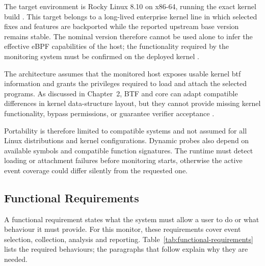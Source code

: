 The target environment is Rocky Linux 8.10 on x86-64, running the exact kernel
build . This target belongs to a
long-lived enterprise kernel line in which selected fixes and features are
backported while the reported upstream base version remains stable. The
nominal version therefore cannot be used alone to infer the effective eBPF
capabilities of the host; the functionality required by the monitoring system
must be confirmed on the deployed kernel
\cite{redhat2025backporting}.

The architecture assumes that the monitored host exposes usable kernel
\gls{btf} information and grants the privileges required to load and attach the
selected programs. As discussed in Chapter~2, BTF and \gls{core} can adapt
compatible differences in kernel data-structure layout, but they cannot provide
missing kernel functionality, bypass permissions, or guarantee verifier
acceptance
\cite{linux_btf,linux_bpf_llvm_relocations,linux_libbpf_overview,
linux2026ebpfverifier}. 

Portability is therefore limited to compatible systems and not assumed for
all Linux distributions and kernel configurations. Dynamic probes also depend
on available symbols and compatible function signatures. The runtime must
detect loading or attachment failures before monitoring starts, otherwise the
active event coverage could differ silently from the requested one.

\subsection{Functional Requirements}
\label{subsec:functional-requirements}

A functional requirement states what the system must allow a user to do or
  what behaviour it must provide. For this monitor, these requirements cover
  event selection, collection, analysis and reporting.
  Table~\ref{tab:functional-requirements} lists the required behaviours; the
  paragraphs that follow explain why they are needed.
  
